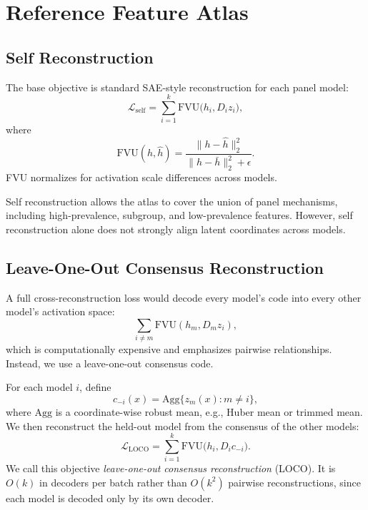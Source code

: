 \documentclass[11pt]{article}
\newcommand{\fvu}{\mathrm{FVU}}
\newcommand{\agg}{\mathrm{Agg}}
\begin{document}
\section{Reference Feature Atlas}

\subsection{Self Reconstruction}

The base objective is standard SAE-style reconstruction for each panel model:
\begin{equation}
    \mathcal{L}_{\mathrm{self}}
    = \sum_{i=1}^{k} \fvu\big(h_i, D_i z_i\big),
\end{equation}
where
\begin{equation}
    \fvu(h,\hat h)=\frac{\|h-\hat h\|_2^2}{\|h-\bar h\|_2^2+\epsilon}.
\end{equation}
FVU normalizes for activation scale differences across models.

Self reconstruction allows the atlas to cover the union of panel mechanisms, including high-prevalence, subgroup, and low-prevalence features. However, self reconstruction alone does not strongly align latent coordinates across models.

\subsection{Leave-One-Out Consensus Reconstruction}

A full cross-reconstruction loss would decode every model's code into every other model's activation space:
\begin{equation}
    \sum_{i\neq m} \fvu(h_m, D_m z_i),
\end{equation}
which is computationally expensive and emphasizes pairwise relationships. Instead, we use a leave-one-out consensus code.

For each model $i$, define
\begin{equation}
    c_{-i}(x)=\agg\{z_m(x):m\neq i\},
\end{equation}
where $\agg$ is a coordinate-wise robust mean, e.g., Huber mean or trimmed mean. We then reconstruct the held-out model from the consensus of the other models:
\begin{equation}
    \mathcal{L}_{\mathrm{LOCO}}
    = \sum_{i=1}^{k} \fvu\big(h_i, D_i c_{-i}\big).
\end{equation}
We call this objective \emph{leave-one-out consensus reconstruction} (LOCO). It is $O(k)$ in decoders per batch rather than $O(k^2)$ pairwise reconstructions, since each model is decoded only by its own decoder.
\end{document}
